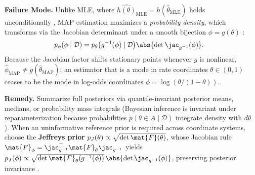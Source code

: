 \documentclass[../../../../master.tex]{subfiles}
\begin{document}
\begin{pitfall}
\textbf{Failure Mode.} Unlike MLE, where $\widehat{h(\theta)}_{\mathrm{MLE}} = h(\hat{\theta}_{\mathrm{MLE}})$ holds unconditionally , MAP estimation maximizes a \emph{probability density}, which transforms via the Jacobian determinant under a smooth bijection $\phi = g(\theta)$ :
\begin{equation}
p_\phi(\phi \mid \mathcal{D}) = p_\theta\bigl(g^{-1}(\phi) \mid \mathcal{D}\bigr) \abs{\det \jac_{g^{-1}}(\phi)}.
\end{equation}
Because the Jacobian factor shifts stationary points whenever $g$ is nonlinear, $\hat{\phi}_{\mathrm{MAP}} \ne g(\hat{\theta}_{\mathrm{MAP}})$: an estimator that is a mode in rate coordinates $\theta \in (0, 1)$ ceases to be the mode in log-odds coordinates $\phi = \log(\theta/(1-\theta))$.

\textbf{Remedy.} Summarize full posteriors via quantile-invariant posterior means, medians, or probability mass integrals (Bayesian inference is invariant under reparameterization because probabilities $p(\theta\in A\mid\mathcal{D})$ integrate density with $d\theta$). When an uninformative reference prior is required across coordinate systems, choose the \textbf{Jeffreys prior} $p_J(\theta) \propto \sqrt{\det \mat{F}(\theta)}$, whose Jacobian rule $\mat{F}_\phi = \jac_{g^{-1}}^\top \mat{F}_\theta \jac_{g^{-1}}$ yields $p_J(\phi) \propto \sqrt{\det \mat{F}_\theta(g^{-1}(\phi))}\,\abs{\det \jac_{g^{-1}}(\phi)}$, preserving posterior invariance .
\end{pitfall}
\end{document}
